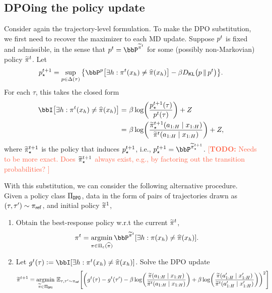 \documentclass{article}
\newcommand{\todo}[1]{\textcolor{Tomato}{[\textbf{TODO:} {#1}]}}
\begin{document}
\subsection{DPOing the policy update} 
Consider again the trajectory-level formulation. 
To make the DPO substitution, we first need to recover the maximizer to each MD update. 
Suppose $p^{t}$ is fixed and admissible, in the sense that $p\ind{t} = \bbP^{\wt\pi\ind{t}}$ for some (possibly non-Markovian) policy $\widetilde\pi^{t}$. 
Let 
\begin{align}
  \label{eq:unconstrained-md-update}
  p\ind{t+1}_\star 
  = 
  \sup_{p\in\Delta(\tau)}{} \cbr*{\bbP^p\sbr*{\exists h : \pi\ind{t}(x_h) \neq \pihat(x_h)}
  - \beta\Dkl{p}{p\ind{t}}}. 
\end{align}
For each $\tau$, this takes the closed form 
\begin{align*}
  \bbI\sbr*{\exists h : \pi\ind{t}(x_h) \neq \pihat(x_h)}
  =&~ 
  \beta\log\rbr*{\frac{p\ind{t+1}_\star(\tau)}{p\ind{t}(\tau)}} + Z
  \\
  =&~ 
  \beta\log\rbr*{\frac{\wt\pi_\star\ind{t+1}(a_{1:H}\mid{}x_{1:H})}{\wt\pi\ind{t}(a_{1:H}\mid{}x_{1:H})}} + Z,
\end{align*}
where $\widetilde\pi_\star^{t+1}$ is the policy that induces $p^{t+1}_\star$, i.e., $p\ind{t+1}_\star = \bbP^{\wt\pi_\star\ind{t+1}}$. 
\todo{Needs to be more exact. Does $\widetilde\pi^{t+1}_\star$ always exist, e.g., by factoring out the transition probabilities? }

With this substitution, we can consider the following alternative procedure. Given a policy class $\Pi_{\texttt{DPO}}$, data in the form of pairs of trajectories drawn as $(\tau,\tau')\sim \pi_\mathsf{ref}$, and initial policy $\widetilde\pi^{1}$, 
\begin{enumerate}
  \item Obtain the best-response policy w.r.t the current $\widetilde\pi^{t}$,
  \begin{align*}
    \pi\ind{t} = \argmin_{\pi\in\Pi_\veps(\pihat)}{}\bbP^{\wt\pi\ind{t}}\sbr*{\exists h : \pi(x_h) \neq \pihat(x_h)}.
  \end{align*}
  \item Let $g\ind{t}(\tau) \ldef{} \bbI\sbr*{\exists h : \pi\ind{t}(x_h) \neq \pihat(x_h)}$. Solve the DPO update 
  \begin{align}
  \label{eq:dpo-update}
    \wt\pi\ind{t+1} = \argmin_{\wt\pi \in \Pi_{\dpo}}{} \En_{\tau,\tau' \sim \piref}\sbr*{\rbr*{g\ind{t}(\tau) - g\ind{t}(\tau') - \beta\log\rbr*{\frac{\wt\pi(a_{1:H}\mid{}x_{1:H})}{\wt\pi\ind{t}(a_{1:H}\mid{}x_{1:H})}} +  \beta\log\rbr*{\frac{\wt\pi(a'_{1:H}\mid{}x'_{1:H})}{\wt\pi\ind{t}(a'_{1:H}\mid{}x'_{1:H})}}}^2}
  \end{align}
\end{enumerate}
\end{document}
